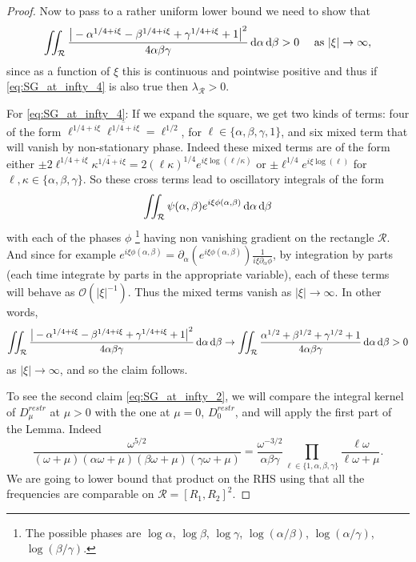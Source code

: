 \documentclass[reqno,11pt,letterpaper]{amsart}
\numberwithin{equation}{section}
\newcommand{\dd}{\, {\rm d}}
\begin{document}
\begin{proof}
Now to pass to a rather uniform lower bound we need to show that \begin{align}\label{eq:SG_at_infty_4} \iint_{\mathcal{R}} \frac{\big\vert -\alpha^{1/4+i\xi} - \beta^{1/4+i\xi}+
            \gamma^{1/4+i\xi}+1
        \big\vert^2}{4\alpha\beta\gamma} 
 \dd\alpha\dd\beta > 0 \quad \text{ as } |\xi| \to \infty,\end{align}
 since as a function of $\xi$ this is continuous and pointwise positive and thus if \eqref{eq:SG_at_infty_4} is also true then $\lambda_{\mathcal{R}}>0$.
 
 For \eqref{eq:SG_at_infty_4}: If we expand the square, we get two kinds of terms: four of the form $\ell^{1/4+i\xi}\overline{\ell^{1/4+i\xi}} = \ell^{1/2}$, for $\ell\in\{\alpha,\beta, \gamma, 1\}$,  and six mixed term that will vanish by non-stationary phase. Indeed these mixed terms are of the form
 either $ \pm 2 \ell^{1/4+i\xi} \overline{\kappa^{1/4+i\xi}} = 2 (\ell\kappa)^{1/4}e^{i \xi \log (\ell/\kappa)}$ or $\pm \ell^{1/4}e^{i \xi \log (\ell)}$ for $\ell, \kappa \in\{\alpha,\beta, \gamma\}$. So these cross terms lead to oscillatory integrals of the form $$\iint_{\mathcal{R}} \psi(\alpha, \beta)e^{i\xi \phi(\alpha, \beta)}\dd\alpha \dd \beta $$
 with each of the phases $\phi$ \footnote{The possible phases are
$\log\alpha$, $\log\beta$,  $\log\gamma$, $\log(\alpha/\beta)$, $\log(\alpha/\gamma)$,
$\log(\beta/\gamma)$.} having non vanishing gradient on the rectangle  $\mathcal{R}$. And since for example $e^{i\xi \phi(\alpha, \beta)} = \partial_\alpha (e^{i\xi \phi(\alpha, \beta)}) \frac{1}{i \xi\partial_\alpha \phi }$, by integration by parts (each time integrate by parts in the appropriate variable), each of these terms will behave as $\mathcal{O}(|\xi|^{-1})$. Thus the mixed terms vanish as $|\xi| \to \infty$. In other words, 
 $$ \iint_{\mathcal{R}} \frac{\big\vert -\alpha^{1/4+i\xi} - \beta^{1/4+i\xi}+
            \gamma^{1/4+i\xi}+1
        \big\vert^2}{4\alpha\beta\gamma} 
 \dd\alpha\dd\beta \to \iint_{\mathcal{R}} \frac{\alpha^{1/2}+\beta^{1/2}+\gamma^{1/2}+1}{4\alpha\beta\gamma} 
 \dd\alpha\dd\beta > 0$$
 as $|\xi| \to \infty$, and
 so the claim follows. 
 
 To see the second claim \eqref{eq:SG_at_infty_2}, we will compare the integral kernel of $D_\mu^{restr}$ at $\mu>0$ with the one at $\mu=0$, $D_0^{restr}$, and will apply the first part of the Lemma.
 Indeed $$\frac{\omega^{5/2}}{(\omega+\mu)(\alpha\omega+\mu)(\beta\omega+\mu)(\gamma\omega+\mu)} = \frac{\omega^{-3/2}}{\alpha\beta\gamma}
    \prod_{\ell \in\{1,\alpha,\beta,\gamma\}}
    \frac{\ell \omega}{\ell\omega+\mu}.$$
    We are going to lower bound that product on the RHS using that all the frequencies are comparable on $\mathcal{R} =[R_1,R_2]^2$. 
    

\end{proof}
\end{document}
